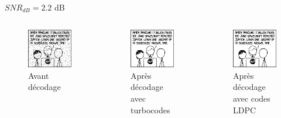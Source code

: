 \documentclass[11pt]{beamer}
\begin{document}
\begin{frame}{$SNR_{dB} = 2.2$ dB}
	\begin{columns}
		\begin{column}{.3\textwidth}
			\begin{figure}
				\includegraphics[scale=0.4]{turbo_noisy_60}\\
				Avant d\'ecodage
			\end{figure}
		\end{column}
		\begin{column}{.3\textwidth}
			\begin{figure}
				\includegraphics[scale=0.4]{turbo_decoded_60}\\
				Apr\`es d\'ecodage avec turbocodes
			\end{figure}
		\end{column}
		\begin{column}{.3\textwidth}
			\begin{figure}
				\includegraphics[scale=0.4]{ldpc_basic_decoded_60}\\
				Apr\`es d\'ecodage avec codes LDPC
			\end{figure}
		\end{column}
	\end{columns}
\end{frame}
\end{document}
